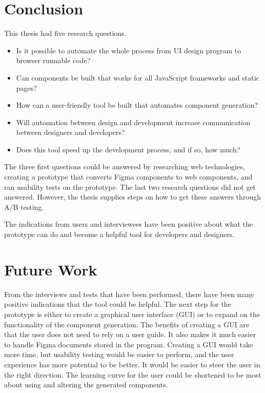 \section{Conclusion}
\label{sub:conclusion}
This thesis had five research questions.  
\begin{itemize}
  \item Is it possible to automate the whole process from UI design program to browser runnable code? 
 \item Can components be built that works for all JavaScript frameworks and static pages?
  \item How can a user-friendly tool be built that automates component generation?  
  \item Will automation between design and development increase communication between designers and developers?
  \item Does this tool speed up the development process, and if so, how much? 
\end{itemize}

The three first questions could be answered by researching web technologies, creating a prototype that converts Figma components to web components, and ran usability tests on the prototype. The last two research questions did not get answered. However, the thesis supplies steps on how to get these answers through A/B testing. 

The indications from users and interviewees have been positive about what the prototype can do and become a helpful tool for developers and designers. 

\section{Future Work}%
\label{sub:Future Work}

From the interviews and tests that have been performed, there have been many positive indications that the tool could be helpful. The next step for the prototype is either to create a graphical user interface (GUI) or to expand on the functionality of the component generation. The benefits of creating a GUI are that the user does not need to rely on a user guide. It also makes it much easier to handle Figma documents stored in the program. Creating a GUI would take more time, but usability testing would be easier to perform, and the user experience has more potential to be better. It would be easier to steer the user in the right direction. The learning curve for the user could be shortened to be most about using and altering the generated components. 

